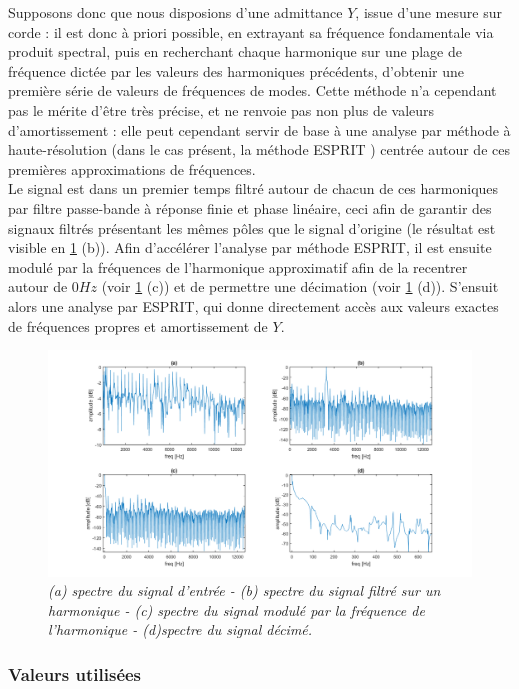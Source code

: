 Supposons donc que nous disposions d'une admittance $Y$, issue d'une mesure sur corde : il est donc à priori possible, en extrayant sa fréquence fondamentale via produit spectral, puis en recherchant chaque harmonique sur une plage de fréquence dictée par les valeurs des harmoniques précédents, d'obtenir une première série de valeurs de fréquences de modes. Cette méthode n'a cependant pas le mérite d'être très précise, et ne renvoie pas non plus de valeurs d'amortissement : elle peut cependant servir de base à une analyse par méthode à haute-résolution (dans le cas présent, la méthode ESPRIT \cite{badeau2005methodes}) centrée autour de ces premières approximations de fréquences.\\
Le signal est dans un premier temps filtré autour de chacun de ces harmoniques par filtre passe-bande à réponse finie et phase linéaire, ceci afin de garantir des signaux filtrés présentant les mêmes pôles que le signal d'origine (le résultat est visible en \ref{pre_proc} (b)). Afin d'accélérer l'analyse par méthode ESPRIT, il est ensuite modulé par la fréquences de l'harmonique approximatif afin de la recentrer autour de $0 Hz$ (voir \ref{pre_proc} (c)) et de permettre une décimation (voir \ref{pre_proc} (d)). S'ensuit alors une analyse par ESPRIT, qui donne directement accès aux valeurs exactes de fréquences propres et amortissement de $Y$.

\begin{figure}[h]
\includegraphics[scale=0.5]{figures/pre_proc.png}
\caption{\textit{(a) spectre du signal d'entrée - (b) spectre du signal filtré sur un harmonique - (c) spectre du signal modulé par la fréquence de l'harmonique - (d)spectre du signal décimé.}}
\label{pre_proc}
\end{figure}

\subsubsection{Valeurs utilisées}

